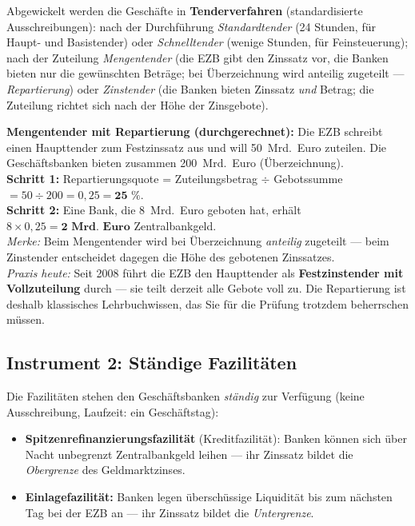 \documentclass[11pt, a4paper]{article}
\begin{document}
Abgewickelt werden die Geschäfte in \textbf{Tenderverfahren} (standardisierte
Ausschreibungen): nach der Durchführung \emph{Standardtender} (24 Stunden, für Haupt- und
Basistender) oder \emph{Schnelltender} (wenige Stunden, für Feinsteuerung); nach der
Zuteilung \emph{Mengentender} (die EZB gibt den Zinssatz vor, die Banken bieten nur die
gewünschten Beträge; bei Überzeichnung wird anteilig zugeteilt --- \emph{Repartierung})
oder \emph{Zinstender} (die Banken bieten Zinssatz \emph{und} Betrag; die Zuteilung
richtet sich nach der Höhe der Zinsgebote).

\begin{beispiel}
\textbf{Mengentender mit Repartierung (durchgerechnet):} Die EZB schreibt einen
Haupttender zum Festzinssatz aus und will 50~Mrd.~Euro zuteilen. Die Geschäftsbanken
bieten zusammen 200~Mrd.~Euro (Überzeichnung).\\[0.3em]
\textbf{Schritt 1:} Repartierungsquote = Zuteilungsbetrag $\div$ Gebotssumme
$= 50 \div 200 = 0{,}25 = \textbf{25~\%}$.\\
\textbf{Schritt 2:} Eine Bank, die 8~Mrd.~Euro geboten hat, erhält
$8 \times 0{,}25 = \textbf{2~Mrd.~Euro}$ Zentralbankgeld.\\[0.3em]
\emph{Merke:} Beim Mengentender wird bei Überzeichnung \emph{anteilig} zugeteilt ---
beim Zinstender entscheidet dagegen die Höhe des gebotenen Zinssatzes.\\[0.3em]
\emph{Praxis heute:} Seit 2008 führt die EZB den Haupttender als \textbf{Festzinstender
mit Vollzuteilung} durch --- sie teilt derzeit alle Gebote voll zu. Die Repartierung ist
deshalb klassisches Lehrbuchwissen, das Sie für die Prüfung trotzdem beherrschen müssen.
\end{beispiel}

\subsection{Instrument 2: Ständige Fazilitäten}

Die Fazilitäten stehen den Geschäftsbanken \emph{ständig} zur Verfügung (keine
Ausschreibung, Laufzeit: ein Geschäftstag):

\begin{itemize}
  \item \textbf{Spitzenrefinanzierungsfazilität} (Kreditfazilität): Banken können sich
    über Nacht unbegrenzt Zentralbankgeld leihen --- ihr Zinssatz bildet die
    \emph{Obergrenze} des Geldmarktzinses.
  \item \textbf{Einlagefazilität:} Banken legen überschüssige Liquidität bis zum nächsten
    Tag bei der EZB an --- ihr Zinssatz bildet die \emph{Untergrenze}.
\end{itemize}
\end{document}
